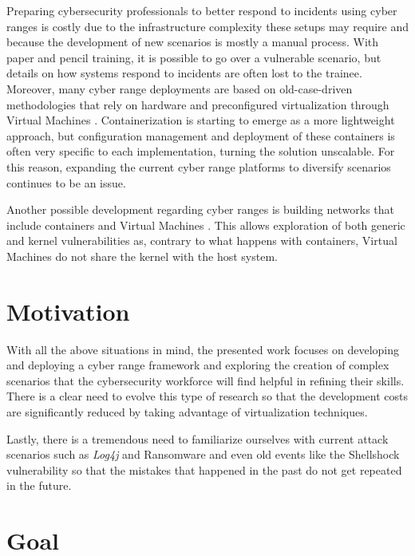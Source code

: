 Preparing cybersecurity professionals to better respond to incidents using cyber ranges is costly due to the infrastructure complexity these setups may require and because the development of new scenarios is mostly a manual process. With paper and pencil training, it is possible to go over a vulnerable scenario, but details on how systems respond to incidents are often lost to the trainee. Moreover, many cyber range deployments are based on old-case-driven methodologies that rely on hardware \cite{national_cr_ref} and preconfigured virtualization through Virtual Machines \cite{cyris_ref, cytrone_ref, leaf_ref}. Containerization is starting to emerge \cite{dsp_ref, cyexec_ref} as a more lightweight approach, but configuration management and deployment of these containers is often very specific to each implementation, turning the solution unscalable. For this reason, expanding the current cyber range platforms to diversify scenarios continues to be an issue.

Another possible development regarding cyber ranges is building networks that include containers and Virtual Machines \cite{capturing_flags_ref}. This allows exploration of both generic and kernel vulnerabilities as, contrary to what happens with containers, Virtual Machines do not share the kernel with the host system.

\section{Motivation} \label{sec:motivation}

With all the above situations in mind, the presented work focuses on developing and deploying a cyber range framework and exploring the creation of complex scenarios that the cybersecurity workforce will find helpful in refining their skills. There is a clear need to evolve this type of research so that the development costs are significantly reduced by taking advantage of virtualization techniques.

Lastly, there is a tremendous need to familiarize ourselves with current attack scenarios such as \textit{Log4j} and Ransomware and even old events like the Shellshock vulnerability so that the mistakes that happened in the past do not get repeated in the future.

\section{Goal} \label{sec:goal}

